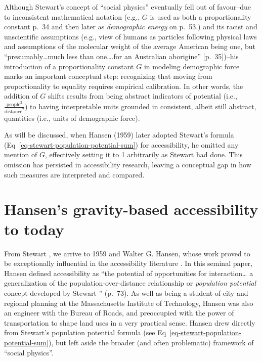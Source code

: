 \documentclass[
  10pt,
  letterpaper,
]{article}
\begin{document}
Although Stewart's concept of ``social physics'' eventually fell out of
favour--due to inconsistent mathematical notation (e.g., \(G\) is used
as both a proportionality constant p.~34 and then later as
\emph{demographic energy} on p.~53.) and its racist and unscientific
assumptions (e.g., view of humans as particles following physical laws
and assumptions of the molecular weight of the average American being
one, but ``presumably\ldots much less than one\ldots.for an Australian
aborigine'' {[}p.~35{]})--his introduction of a proportionality constant
\(G\) in modeling demographic force marks an important conceptual step:
recognizing that moving from proportionality to equality requires
empirical calibration. In other words, the addition of \(G\) shifts
results from being abstract indicators of potential (i.e.,
\(\frac{\text{people}^2}{\text{distance}^{2}}\)) to having interpretable
units grounded in consistent, albeit still abstract, quantities (i.e.,
units of demographic force).

As will be discussed, when Hansen (1959) \citep{hansen1959} later
adopted Stewart's formula (Eq~\ref{eq-stewart-population-potential-sum})
for accessibility, he omitted any mention of \(G\), effectively setting
it to 1 arbitrarily as Stewart had done. This omission has persisted in
accessibility research, leaving a conceptual gap in how such measures
are interpreted and compared.

\section{Hansen's gravity-based accessibility to
today}\label{grav-to-today}

From Stewart \citep{stewartDemographicGravitationEvidence1948}, we
arrive to 1959 and Walter G. Hansen, whose work proved to be
exceptionally influential in the accessibility literature
\citep{hansen1959}. In this seminal paper, Hansen defined accessibility
as ``the potential of opportunities for interaction\ldots{} a
generalization of the population-over-distance relationship or
\emph{population potential} concept developed by Stewart
\citep{stewartDemographicGravitationEvidence1948}'' (p.~73). As well as
being a student of city and regional planning at the Massachusetts
Institute of Technology, Hansen was also an engineer with the Bureau of
Roads, and preoccupied with the power of transportation to shape land
uses in a very practical sense. Hansen \citep{hansen1959} drew directly
from Stewart's population potential formula (see
Eq~\ref{eq-stewart-population-potential-sum}), but left aside the
broader (and often problematic) framework of ``social physics''.
\end{document}
